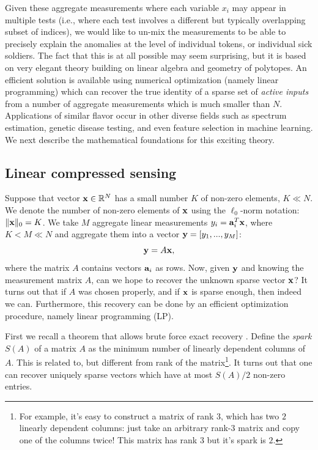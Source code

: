 Given these aggregate measurements where each variable $x_i$ may appear in multiple tests
(i.e., where each test involves a different but typically overlapping subset of indices), we would like to un-mix the
measurements to be able to precisely explain the anomalies at the level of individual tokens,
or individual sick soldiers.  The fact that this is at all possible may seem surprising, but it
is based on very elegant theory building on linear algebra and geometry of polytopes.  An
efficient solution is available using numerical optimization (namely linear programming) which
can recover the true identity of a sparse set of {\em active inputs} from a number of aggregate
measurements which is much smaller than $N$. Applications of similar flavor occur in
other diverse fields such as spectrum estimation, genetic disease testing, and even feature
selection in machine learning. We next describe the mathematical foundations for this exciting
theory.

\subsection{ Linear compressed sensing}

Suppose that  vector $\mathbf{x} \in \mathbb{R}^N$ has a small number $K$ of non-zero elements, $K \ll N$.
We denote the number of non-zero elements of $\mathbf{x}$ using the $\ell_0$-norm notation:
$\Vert \mathbf{x} \Vert_0 = K$.   We take $M$ aggregate linear measurements $y_i = \mathbf{a}_i^T \mathbf{x}$, where
$K < M \ll N$ and aggregate them into a vector $\mathbf{y} = [y_1, ..., y_M]$:
\begin{equation}
\mathbf{y} = A \mathbf{x},
\end{equation}
where the matrix $A$ contains vectors $\mathbf{a}_i$ as rows. Now, given $\mathbf{y}$ and knowing the
measurement matrix $A$, can we hope to recover the unknown
sparse vector $\mathbf{x}$?  It turns out that if $A$ was chosen properly, and if $\mathbf{x}$ is sparse
enough, then indeed we can. Furthermore, this recovery can be done by an efficient optimization
procedure, namely linear programming (LP).

First we recall a theorem that allows brute force exact recovery \cite{donoho_pnas}. Define the {\em spark}
$S(A)$ of a matrix $A$ as the minimum number of linearly dependent columns of $A$. This is related to,
but different from rank of the matrix\footnote{For example, it's easy to construct a matrix of rank
$3$, which has two $2$ linearly dependent columns: just take an arbitrary rank-$3$ matrix and
copy one of the columns twice! This matrix has rank $3$ but it's spark is $2$. }. It turns out that
one can recover uniquely sparse vectors which have at most $S(A) / 2$ non-zero entries.

